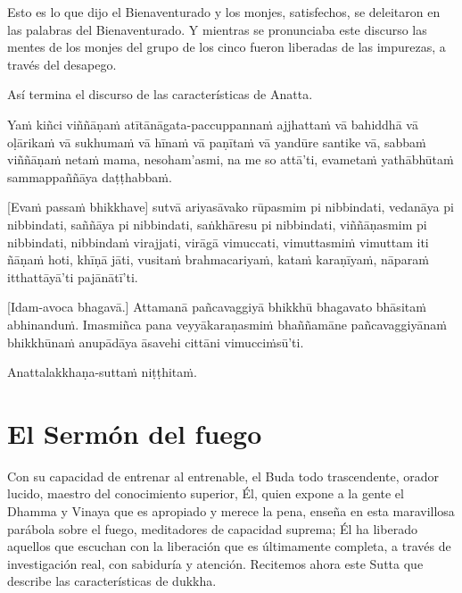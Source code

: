 Esto es lo que dijo el Bienaventurado y los monjes, satisfechos, se deleitaron en las palabras del Bienaventurado. Y mientras se pronunciaba este discurso las mentes de los monjes del grupo de los cinco fueron liberadas de las impurezas, a través del desapego.

Así termina el discurso de las características de Anatta.

\clearpage

\paliText
\markboth{\paliTitle}{\rightmark}

Yaṁ kiñci viññāṇaṁ atītānāgata-paccuppannaṁ ajjhattaṁ vā bahiddhā vā
oḷārikaṁ vā sukhumaṁ vā hīnaṁ vā paṇītaṁ vā yandūre santike vā, sabbaṁ
viññāṇaṁ netaṁ mama, nesoham'asmi, na me so attā'ti, evametaṁ yathābhūtaṁ
sammappaññāya daṭṭhabbaṁ.

[Evaṁ passaṁ bhikkhave] sutvā ariyasāvako rūpasmim pi nibbindati, vedanāya
pi nibbindati, saññāya pi nibbindati, saṅkhāresu pi nibbindati,
viññāṇasmim pi nibbindati, nibbindaṁ virajjati, virāgā vimuccati,
vimuttasmiṁ vimuttam iti ñāṇaṁ hoti, khīṇā jāti, vusitaṁ brahmacariyaṁ,
kataṁ karaṇīyaṁ, nāparaṁ itthattāyā'ti pajānātī'ti.

[Idam-avoca bhagavā.] Attamanā pañcavaggiyā bhikkhū bhagavato bhāsitaṁ
abhinanduṁ. Imasmiñca pana veyyākaraṇasmiṁ bhaññamāne pañcavaggiyānaṁ
bhikkhūnaṁ anupādāya āsavehi cittāni vimucciṁsū'ti.

Anattalakkhaṇa-suttaṁ niṭṭhitaṁ.

\chapterTocDelegatePageNumber
\chapter{El Sermón del fuego}

\setTocDelegatedPageNumber
\englishText
\renewcommand{\englishTitle}{El Sermón del fuego}

\begin{leader}

Con su capacidad de entrenar al entrenable, el Buda todo trascendente, orador lucido, maestro del conocimiento superior,
Él, quien expone a la gente el Dhamma y Vinaya que es apropiado y merece la pena, enseña en esta maravillosa parábola sobre el fuego, meditadores de capacidad suprema;
Él ha liberado aquellos que escuchan con la liberación que es últimamente completa, a través de investigación real, con sabiduría y atención.
Recitemos ahora este Sutta que describe las características de dukkha.



\end{leader}

